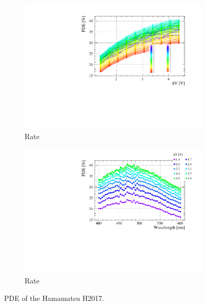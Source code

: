 \begin{landscape}
\begin{figure}[htbp]
\begin{subfigure}{0.65\textwidth}
        \includegraphics[width=\linewidth]{gfx/plots/PDE/H2017/c_Freq_Bias.pdf}    
        \caption{Rate}
    \end{subfigure}
    \begin{subfigure}{0.65\textwidth}
        \includegraphics[width=\linewidth]{gfx/plots/PDE/H2017/c_Freq_Wavelength.pdf} 
        \caption{Rate}
    \end{subfigure}
    \caption{PDE of the Hamamatsu H2017.}
    \label{fig:pde H2017}
\end{figure}
\end{landscape}

